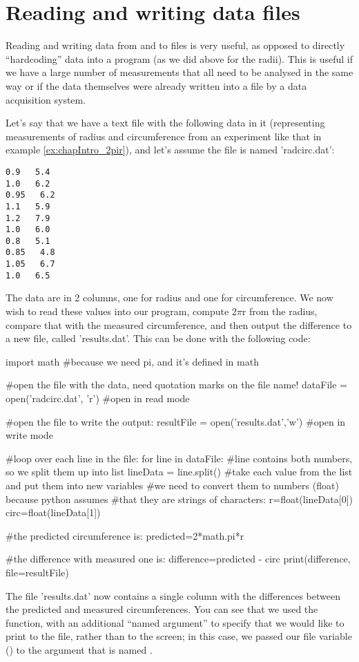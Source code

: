 \section{Reading and writing data files}
Reading and writing data from and to files is very useful, as opposed to directly ``hardcoding'' data into a program (as we did above for the radii). This is useful if we have a large number of measurements that all need to be analysed in the same way or if the data themselves were already written into a file by a data acquisition system.

Let's say that we have a text file with the following data in it (representing measurements of radius and circumference from an experiment like that in example \ref{ex:chapIntro_2pir}), and let's assume the file is named 'radcirc.dat':
\begin{verbatim}
0.9   5.4
1.0   6.2
0.95   6.2
1.1   5.9
1.2   7.9
1.0   6.0
0.8   5.1
0.85   4.8
1.05   6.7
1.0   6.5
\end{verbatim}
The data are in 2 columns, one for radius and one for circumference. We now wish to read these values into our program, compute 2$\pi$r from the radius, compare that with the measured circumference, and then output the difference to a new file, called 'results.dat'. This can be done with the following code:
\begin{python}[caption = Reading and writing to a file]
import math #because we need pi, and it's defined in math

#open the file with the data, need quotation marks on the file name!
dataFile = open('radcirc.dat', 'r') #open in read mode

#open the file to write the output:
resultFile = open('results.dat','w') #open in write mode

#loop over each line in the file:
for line in dataFile:
  #line contains both numbers, so we split them up into list
  lineData = line.split()
  #take each value from the list and put them into new variables
  #we need to convert them to numbers (float) because python assumes
  #that they are strings of characters:
  r=float(lineData[0])
  circ=float(lineData[1])
  
  #the predicted circumference is:
  predicted=2*math.pi*r
  
  #the difference with measured one is:
  difference=predicted - circ
  print(difference, file=resultFile)

\end{python}
The file 'results.dat' now contains a single column with the differences between the predicted and measured circumferences. You can see that we used the  function, with an additional ``named argument'' to specify that we would like to print to the file, rather than to the screen; in this case, we passed our file variable () to the argument that is named .

